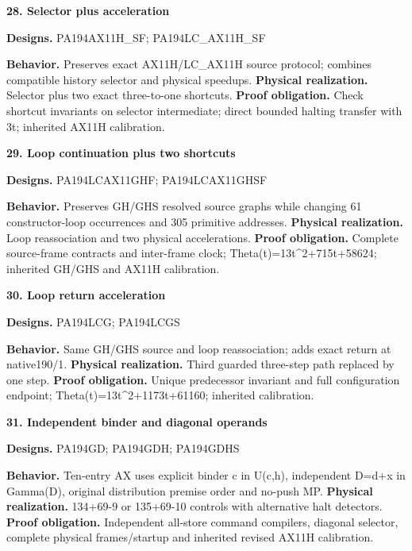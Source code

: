 \documentclass[10pt,a4paper]{article}
\begin{document}
\par\medskip\begin{samepage}\noindent\textbf{28. Selector plus acceleration}\par\nobreak
\textbf{Designs.} PA194\allowbreak{}AX11\allowbreak{}H\_SF;\allowbreak{} PA194\allowbreak{}LC\_AX11\allowbreak{}H\_SF

\textbf{Behavior.} Preserves exact AX11H/LC\_AX11H source protocol; combines compatible history selector and physical speedups. \textbf{Physical realization.} Selector plus two exact three-to-one shortcuts. \textbf{Proof obligation.} Check shortcut invariants on selector intermediate; direct bounded halting transfer with 3t; inherited AX11H calibration.
\end{samepage}

\par\medskip\begin{samepage}\noindent\textbf{29. Loop continuation plus two shortcuts}\par\nobreak
\textbf{Designs.} PA194\allowbreak{}LCAX11\allowbreak{}GHF;\allowbreak{} PA194\allowbreak{}LCAX11\allowbreak{}GHSF

\textbf{Behavior.} Preserves GH/GHS resolved source graphs while changing 61 constructor-loop occurrences and 305 primitive addresses. \textbf{Physical realization.} Loop reassociation and two physical accelerations. \textbf{Proof obligation.} Complete source-frame contracts and inter-frame clock; Theta(t)=13t\textasciicircum{}2+715t+58624; inherited GH/GHS and AX11H calibration.
\end{samepage}

\par\medskip\begin{samepage}\noindent\textbf{30. Loop return acceleration}\par\nobreak
\textbf{Designs.} PA194\allowbreak{}LCG;\allowbreak{} PA194\allowbreak{}LCGS

\textbf{Behavior.} Same GH/GHS source and loop reassociation; adds exact return at native190/1. \textbf{Physical realization.} Third guarded three-step path replaced by one step. \textbf{Proof obligation.} Unique predecessor invariant and full configuration endpoint; Theta(t)=13t\textasciicircum{}2+1173t+61160; inherited calibration.
\end{samepage}

\par\medskip\begin{samepage}\noindent\textbf{31. Independent binder and diagonal operands}\par\nobreak
\textbf{Designs.} PA194\allowbreak{}GD;\allowbreak{} PA194\allowbreak{}GDH;\allowbreak{} PA194\allowbreak{}GDHS

\textbf{Behavior.} Ten-entry AX uses explicit binder c in U(c,\allowbreak{}h), independent D=d+x in Gamma(D), original distribution premise order and no-push MP. \textbf{Physical realization.} 134+69-9 or 135+69-10 controls with alternative halt detectors. \textbf{Proof obligation.} Independent all-store command compilers, diagonal selector, complete physical frames/startup and inherited revised AX11H calibration.
\end{samepage}
\end{document}
